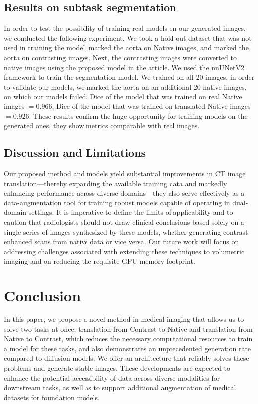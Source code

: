 \documentclass{article}
\begin{document}
\subsection{Results on subtask segmentation}
In order to test the possibility of training real models on our generated images, we conducted the following experiment. We took a hold-out dataset that was not used in training the model, marked the aorta on Native images, and marked the aorta on contrasting images. Next, the contrasting images were converted to native images using the proposed model in the article. We used the nnUNetV2 framework to train the segmentation model. We trained on all 20 images, in order to validate our models, we marked the aorta on an additional 20 native images, on which our models failed.
Dice of the model that was trained on real Native images $= {0.966}$, Dice of the model that was trained on translated Native images $= {0.926}$. These results confirm the huge opportunity for training models on the generated ones, they show metrics comparable with real images.
\subsection{Discussion and Limitations}
\label{sec:discussion}
Our proposed method and models yield substantial improvements in CT image translation—thereby expanding the available training data and markedly enhancing performance across diverse domains—they also serve effectively as a data-augmentation tool for training robust models capable of operating in dual-domain settings. It is imperative to define the limits of applicability and to caution that radiologists should not draw clinical conclusions based solely on a single series of images synthesized by these models, whether generating contrast-enhanced scans from native data or vice versa. Our future work will focus on addressing challenges associated with extending these techniques to volumetric imaging and on reducing the requisite GPU memory footprint.

\section{Conclusion}
In this paper, we propose a novel method in medical imaging that allows us to solve two tasks at once, translation from Contrast to Native and translation from Native to Contrast, which reduces the necessary computational resources to train a model for these tasks, and also demonstrates an unprecedented generation rate compared to diffusion models. We offer an architecture that reliably solves these problems and generate stable images. These developments are expected to enhance the potential accessibility of data across diverse modalities for downstream tasks, as well as to support additional augmentation of medical datasets for foundation models.
\end{document}

